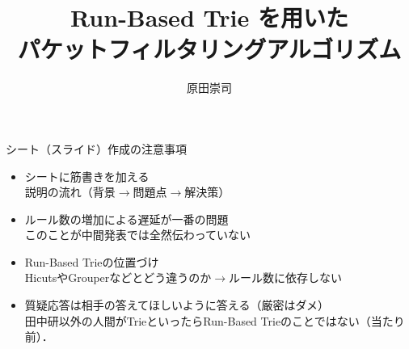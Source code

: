 \documentclass[12pt,dvipdfmx,mathserif,uplatex,aspectratio=32]{beamer}
\title{Run-Based Trie を用いた \\ パケットフィルタリングアルゴリズム}
\subtitle{\empty}
\author[氏名略称]{原田崇司}
\institute[所属略称]{{\normalsize 神奈川大学大学院 理学研究科 情報科学専攻 田中研究室}}
\date{\empty}
\begin{document}



\begin{frame}{シート（スライド）作成の注意事項}
\begin{itemize}
 \item シートに筋書きを加える \\ \hspace{1mm} 説明の流れ（背景$\rightarrow$問題点$\rightarrow$解決策）
  \vspace{2mm}
 \item ルール数の増加による遅延が一番の問題\\ \hspace{1mm}このことが中間発表では全然伝わっていない
  \vspace{2mm}
 \item Run-Based Trieの位置づけ \\ \hspace{1mm} HicutsやGrouperなどとどう違うのか$\rightarrow$ルール数に依存しない
  \vspace{2mm}
 \item 質疑応答は相手の答えてほしいように答える（厳密はダメ） \\ \hspace{1mm} 田中研以外の人間がTrieといったらRun-Based Trieのことではない（当たり前）．
\end{itemize}

\end{frame}


\end{document}
